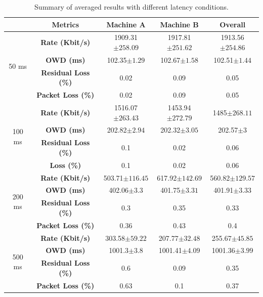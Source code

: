 \begin{table}[h]
\begin{center}
\begin{tabular}{ |c|c|c|c|c| }
\hline
 & Metrics & Machine A & Machine B & Overall\\ \hline
\multirow{4}{*}{50 ms} & \textbf{Rate (Kbit/s)} & 1909.31$\pm258.09$ & 1917.81$\pm251.62$ & 1913.56$\pm254.86$\\ \cline{2-5}
 & \textbf{OWD (ms)} &  102.35$\pm1.29$ & 102.67$\pm1.58$ & 102.51$\pm1.44$ \\ \cline{2-5}
 & \textbf{Residual Loss (\%)} & 0.02 & 0.09 & 0.05 \\ \cline{2-5}
 & \textbf{Packet Loss (\%)} & 0.02 & 0.09 & 0.05 \\ \hline
\multirow{4}{*}{100 ms} & \textbf{Rate (Kbit/s)} & 1516.07$\pm263.43$ & 1453.94$\pm272.79$ & 1485$\pm268.11$\\ \cline{2-5}
 & \textbf{OWD (ms)} & 202.82$\pm2.94$ & 202.32$\pm3.05$ & 202.57$\pm3$ \\ \cline{2-5}
 & \textbf{Residual Loss (\%)} & 0.1 & 0.02 & 0.06 \\ \cline{2-5}
 & \textbf{Loss (\%)} & 0.1 & 0.02 & 0.06 \\ \hline
\multirow{4}{*}{200 ms} & \textbf{Rate (Kbit/s)} & 503.71$\pm116.45$ & 617.92$\pm142.69$ & 560.82$\pm129.57$\\ \cline{2-5}
 & \textbf{OWD (ms)} & 402.06$\pm3.3$ & 401.75$\pm3.31$ & 401.91$\pm3.33$ \\ \cline{2-5}
 & \textbf{Residual Loss (\%)} & 0.3 & 0.35 & 0.33 \\ \cline{2-5}
 & \textbf{Packet Loss (\%)} & 0.36 & 0.43 & 0.4 \\ \hline
\multirow{4}{*}{500 ms} & \textbf{Rate (Kbit/s)} & 303.58$\pm59.22$ & 207.77$\pm32.48$ & 255.67$\pm45.85$\\ \cline{2-5}
 & \textbf{OWD (ms)} & 1001.3$\pm3.8$ & 1001.41$\pm4.09$ & 1001.36$\pm3.99$ \\ \cline{2-5}
 & \textbf{Residual Loss (\%)} & 0.6 & 0.09 & 0.35 \\ \cline{2-5}
 & \textbf{Packet Loss (\%)} & 0.63 & 0.1 & 0.37 \\ \hline
\end{tabular}
    \caption[Summary of averaged results with different latency conditions]{Summary of averaged results with different latency conditions.}
    \label{fig:p2p_delay_bw}
\end{center}
\end{table}

